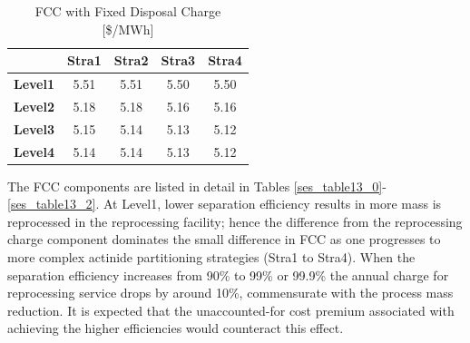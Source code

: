 \begin{table}[htbp]
\begin{center}
\caption{FCC with Fixed Disposal Charge [\$/MWh]}
\label{ses_table12}
\begin{tabular}{|l|c|c|c|c|}
\hline
                & \textbf{Stra1} & \textbf{Stra2} & \textbf{Stra3} & \textbf{Stra4} \\
\hline
\textbf{Level1} & 5.51           & 5.51           & 5.50           & 5.50 \\
\textbf{Level2} & 5.18           & 5.18           & 5.16           & 5.16 \\
\textbf{Level3} & 5.15           & 5.14           & 5.13           & 5.12 \\
\textbf{Level4} & 5.14           & 5.14           & 5.13           & 5.12 \\
\hline
\end{tabular}
\end{center}
\end{table}



The FCC components are listed in detail in Tables \ref{ses_table13_0}-\ref{ses_table13_2}. At Level1, lower
separation efficiency results in more mass is reprocessed in the
reprocessing facility; hence the difference from the reprocessing charge
component dominates the small difference in FCC as one progresses to
more complex actinide partitioning strategies (Stra1 to Stra4).  When
the separation efficiency increases from 90\% to 99\% or 99.9\% the
annual charge for reprocessing service drops by around 10\%,
commensurate with the process mass reduction.  It is expected that the
unaccounted-for cost premium associated with achieving the higher
efficiencies would counteract this effect.  



